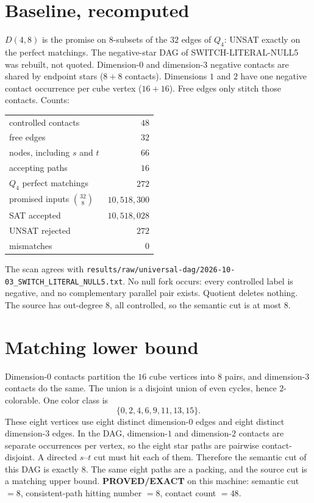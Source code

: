 \documentclass[11pt]{article}
\begin{document}
\section*{Baseline, recomputed}
$D(4,8)$ is the promise on $8$-subsets of the $32$ edges of $Q_4$:
UNSAT exactly on the perfect matchings.
The negative-star DAG of SWITCH-LITERAL-NULL5 was rebuilt, not quoted.
Dimension-$0$ and dimension-$3$ negative contacts are shared by endpoint stars
($8+8$ contacts).
Dimensions $1$ and $2$ have one negative contact occurrence per cube vertex
($16+16$).
Free edges only stitch those contacts.
Counts:
\begin{center}
\begin{tabular}{lr}
controlled contacts & $48$ \\
free edges & $32$ \\
nodes, including $s$ and $t$ & $66$ \\
accepting paths & $16$ \\
$Q_4$ perfect matchings & $272$ \\
promised inputs $\binom{32}{8}$ & $10{,}518{,}300$ \\
SAT accepted & $10{,}518{,}028$ \\
UNSAT rejected & $272$ \\
mismatches & $0$ \\
\end{tabular}
\end{center}
The scan agrees with \texttt{results/raw/universal-dag/2026-10-03\_SWITCH\_LITERAL\_NULL5.txt}.
No null fork occurs: every controlled label is negative, and no complementary parallel pair exists.
Quotient deletes nothing.
The source has out-degree $8$, all controlled, so the semantic cut is at most $8$.

\section*{Matching lower bound}
Dimension-$0$ contacts partition the $16$ cube vertices into $8$ pairs,
and dimension-$3$ contacts do the same.
The union is a disjoint union of even cycles, hence $2$-colorable.
One color class is
\[
\{0,2,4,6,9,11,13,15\}.
\]
These eight vertices use eight distinct dimension-$0$ edges and eight distinct
dimension-$3$ edges.
In the DAG, dimension-$1$ and dimension-$2$ contacts are separate occurrences per vertex,
so the eight star paths are pairwise contact-disjoint.
A directed $s$--$t$ cut must hit each of them.
Therefore the semantic cut of this DAG is exactly $8$.
The same eight paths are a packing, and the source cut is a matching upper bound.
\textbf{PROVED/EXACT} on this machine:
semantic cut $=8$, consistent-path hitting number $=8$, contact count $=48$.
\end{document}
